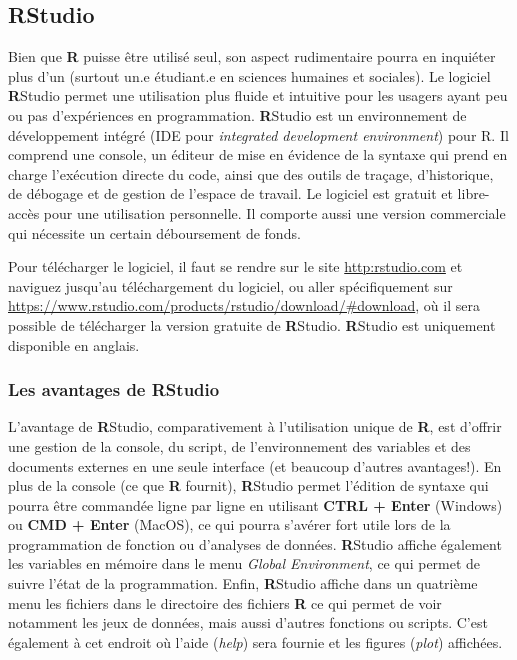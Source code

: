 \documentclass[
]{book}
\begin{document}
\hypertarget{rstudio}{%
\subsection{\texorpdfstring{\textbf{R}Studio}{RStudio}}\label{rstudio}}

Bien que \textbf{R} puisse être utilisé seul, son aspect rudimentaire pourra en inquiéter plus d'un (surtout un.e étudiant.e en sciences humaines et sociales). Le logiciel \textbf{R}Studio permet une utilisation plus fluide et intuitive pour les usagers ayant peu ou pas d'expériences en programmation. \textbf{R}Studio est un environnement de développement intégré (IDE pour \emph{integrated development environment}) pour R. Il comprend une console, un éditeur de mise en évidence de la syntaxe qui prend en charge l'exécution directe du code, ainsi que des outils de traçage, d'historique, de débogage et de gestion de l'espace de travail. Le logiciel est gratuit et libre-accès pour une utilisation personnelle. Il comporte aussi une version commerciale qui nécessite un certain déboursement de fonds.

Pour télécharger le logiciel, il faut se rendre sur le site \url{http:rstudio.com} et naviguez jusqu'au téléchargement du logiciel, ou aller spécifiquement sur \url{https://www.rstudio.com/products/rstudio/download/\#download}, où il sera possible de télécharger la version gratuite de \textbf{R}Studio. \textbf{R}Studio est uniquement disponible en anglais.

\hypertarget{les-avantages-de-rstudio}{%
\subsubsection{\texorpdfstring{Les avantages de \textbf{R}Studio}{Les avantages de RStudio}}\label{les-avantages-de-rstudio}}

L'avantage de \textbf{R}Studio, comparativement à l'utilisation unique de \textbf{R}, est d'offrir une gestion de la console, du script, de l'environnement des variables et des documents externes en une seule interface (et beaucoup d'autres avantages!). En plus de la console (ce que \textbf{R} fournit), \textbf{R}Studio permet l'édition de syntaxe qui pourra être commandée ligne par ligne en utilisant \textbf{CTRL + Enter} (Windows) ou \textbf{CMD + Enter} (MacOS), ce qui pourra s'avérer fort utile lors de la programmation de fonction ou d'analyses de données. \textbf{R}Studio affiche également les variables en mémoire dans le menu \emph{Global Environment}, ce qui permet de suivre l'état de la programmation. Enfin, \textbf{R}Studio affiche dans un quatrième menu les fichiers dans le directoire des fichiers \textbf{R} ce qui permet de voir notamment les jeux de données, mais aussi d'autres fonctions ou scripts. C'est également à cet endroit où l'aide (\emph{help}) sera fournie et les figures (\emph{plot}) affichées.
\end{document}
